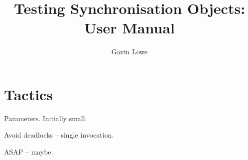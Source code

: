 \documentclass[12pt,a4paper]{article}
\title{Testing Synchronisation Objects: User Manual}
\author{Gavin Lowe}
\begin{document}
\maketitle








\section{Tactics}


Parameters.  Initially small.

 Avoid deadlocks -- single invocation. 

ASAP -- maybe.





\appendix



\end{document}
